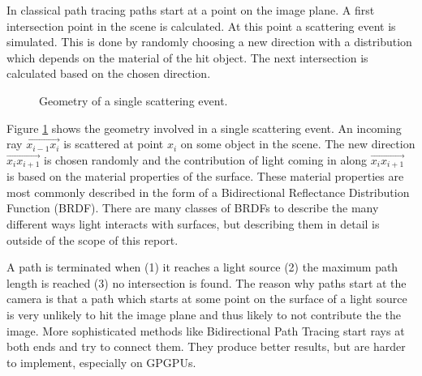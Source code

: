 \documentclass{ACGSeminar}
\begin{document}
In classical path tracing paths start at a point on the image plane. A first intersection point in the scene is calculated. At this point a scattering event is simulated. This is done by randomly choosing a new direction with a distribution which depends on the material of the hit object. The next intersection is calculated based on the chosen direction.

\begin{figure}[htb!]
  \begin{centering}
    \par
  \end{centering}
  \caption{Geometry of a single scattering event.}
  \label{fig:scattering-event}
\end{figure}

Figure \ref{fig:scattering-event} shows the geometry involved in a single scattering event. An incoming ray $\overrightarrow{x_{i-1}x_i}$ is scattered at point $x_i$ on some object in the scene. The new direction $\overrightarrow{x_ix_{i+1}}$ is chosen randomly and the contribution of light coming in along $\overrightarrow{x_ix_{i+1}}$ is based on the material properties of the surface. These material properties are most commonly described in the form of a Bidirectional Reflectance Distribution Function (BRDF). There are many classes of BRDFs to describe the many different ways light interacts with surfaces, but describing them in detail is outside of the scope of this report.

A path is terminated when (1) it reaches a light source (2) the maximum path length is reached (3) no intersection is found.
The reason why paths start at the camera is that a path which starts at some point on the surface of a light source is very unlikely to hit the image plane and thus likely to not contribute the the image. More sophisticated methods like Bidirectional Path Tracing start rays at both ends and try to connect them. They produce better results, but are harder to implement, especially on GPGPUs.
\end{document}
